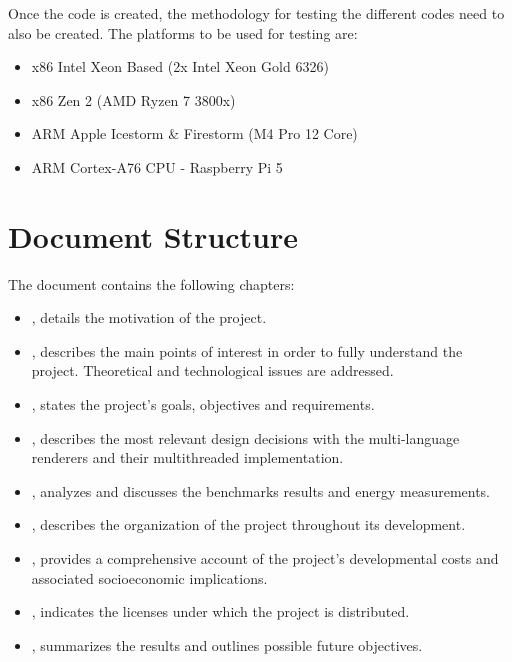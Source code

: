 Once the code is created, the methodology for testing the different codes need to also be created. The platforms to be used for testing are:
\begin{itemize}
    \item x86 Intel Xeon Based (2x Intel Xeon Gold 6326)
    \item x86 Zen 2 (AMD Ryzen 7 3800x)
    \item ARM Apple Icestorm \& Firestorm (M4 Pro 12 Core)
    \item ARM Cortex-A76 CPU - Raspberry Pi 5
\end{itemize} 

\section{Document Structure}\label{sec:structure}
The document contains the following chapters:
\begin{itemize}
  \item {}, details the motivation of the project.
  \item {}, describes the main points of interest in order to fully understand the project. Theoretical and technological issues are addressed.
  \item {}, states the project's goals, objectives and requirements.
  \item {}, describes the most relevant design decisions with the multi-language renderers and their multithreaded implementation.
  \item {}, analyzes and discusses the benchmarks results and energy measurements.
  \item {}, describes the organization of the project throughout its development.
  \item {}, provides a comprehensive account of the project's developmental costs and associated socioeconomic implications.
  \item {}, indicates the licenses under which the project is distributed.
  \item {}, summarizes the results and outlines possible future objectives.
\end{itemize}
